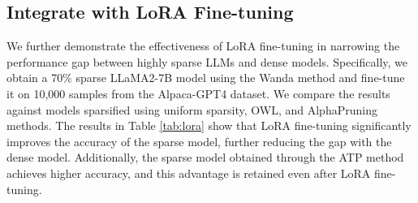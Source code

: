 \subsection{Integrate with LoRA Fine-tuning}\label{sec:integrate_LoRA}
We further demonstrate the effectiveness of LoRA fine-tuning \citep{hu2021lora} in narrowing the performance gap between highly sparse LLMs and dense models. Specifically, we obtain a 70$\%$ sparse LLaMA2-7B model using the Wanda method and fine-tune it on 10,000 samples from the Alpaca-GPT4 \citep{peng2023instruction} dataset. We compare the results against models sparsified using uniform sparsity, OWL, and AlphaPruning methods. The results in Table \ref{tab:lora} show that LoRA fine-tuning significantly improves the accuracy of the sparse model, further reducing the gap with the dense model. Additionally, the sparse model obtained through the ATP method achieves higher accuracy, and this advantage is retained even after LoRA fine-tuning.
\begin{table}[h!]
    \centering
    \caption{Comparison of the perplexity and zero-shot accuracy of the 70$\%$ sparse LLaMA2-7B obtained by LoRA fine-tuning.}\label{tab:lora}
\end{table}

